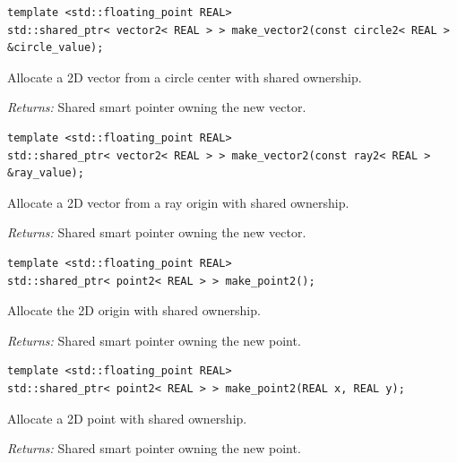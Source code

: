 \par\noindent\begin{minipage}{\linewidth}
\begin{lstlisting}[style=apireference]
template <std::floating_point REAL>
std::shared_ptr< vector2< REAL > > make_vector2(const circle2< REAL > &circle_value);
\end{lstlisting}
{\footnotesize Allocate a 2D vector from a circle center with shared ownership.\par}
{\footnotesize\textit{Returns:} Shared smart pointer owning the new vector.\par}
\end{minipage}\par\vspace{1pt}
\par\noindent\begin{minipage}{\linewidth}
\begin{lstlisting}[style=apireference]
template <std::floating_point REAL>
std::shared_ptr< vector2< REAL > > make_vector2(const ray2< REAL > &ray_value);
\end{lstlisting}
{\footnotesize Allocate a 2D vector from a ray origin with shared ownership.\par}
{\footnotesize\textit{Returns:} Shared smart pointer owning the new vector.\par}
\end{minipage}\par\vspace{1pt}
\par\noindent\begin{minipage}{\linewidth}
\begin{lstlisting}[style=apireference]
template <std::floating_point REAL>
std::shared_ptr< point2< REAL > > make_point2();
\end{lstlisting}
{\footnotesize Allocate the 2D origin with shared ownership.\par}
{\footnotesize\textit{Returns:} Shared smart pointer owning the new point.\par}
\end{minipage}\par\vspace{1pt}
\par\noindent\begin{minipage}{\linewidth}
\begin{lstlisting}[style=apireference]
template <std::floating_point REAL>
std::shared_ptr< point2< REAL > > make_point2(REAL x, REAL y);
\end{lstlisting}
{\footnotesize Allocate a 2D point with shared ownership.\par}
{\footnotesize\textit{Returns:} Shared smart pointer owning the new point.\par}
\end{minipage}\par\vspace{1pt}

